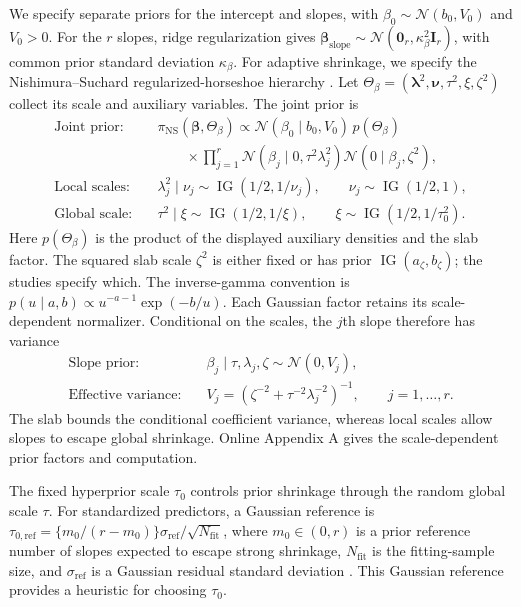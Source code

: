 \documentclass[12pt,letterpaper]{article}
\numberwithin{equation}{section}
\newcommand{\Normal}{\mathcal{N}}
\newcommand{\vect}[1]{\bm{#1}}
\newcommand{\mat}[1]{\bm{#1}}
\DeclareMathOperator{\IG}{IG}
\newcommand{\Id}[1]{\mat I_{#1}}
\newcommand{\zeros}[1]{\vect 0_{#1}}
\begin{document}
We specify separate priors for the intercept and slopes, with
\(\beta_0\sim\Normal(b_0,V_0)\) and \(V_0>0\). For the \(r\) slopes,
ridge regularization gives
\(\vect\beta_{\mathrm{slope}}\sim
\Normal(\zeros{r},\kappa_\beta^2\Id{r})\), with common prior standard
deviation \(\kappa_\beta\). For adaptive shrinkage, we specify the
Nishimura--Suchard regularized-horseshoe hierarchy
\citep{CarvalhoPolsonScott2010HS,PiironenVehtari2017RHS,
MakalicSchmidt2016SimpleSampler,NishimuraSuchard2023SSS}. Let
\(\Theta_\beta=(\vect\lambda^2,\vect\nu,\tau^2,\xi,\zeta^2)\)
collect its scale and auxiliary variables. The joint prior is
\begin{equation}
\begin{aligned}
\text{Joint prior:}\quad
&\pi_{\mathrm{NS}}(\vect\beta,\Theta_\beta)
 \propto\Normal(\beta_0\mid b_0,V_0)\,p(\Theta_\beta)\\
&\qquad\times\prod_{j=1}^r
 \Normal(\beta_j\mid0,\tau^2\lambda_j^2)
 \Normal(0\mid\beta_j,\zeta^2),\\
\text{Local scales:}\quad
&\lambda_j^2\mid\nu_j\sim\IG(1/2,1/\nu_j),\qquad
 \nu_j\sim\IG(1/2,1),\\
\text{Global scale:}\quad
&\tau^2\mid\xi\sim\IG(1/2,1/\xi),\qquad
 \xi\sim\IG(1/2,1/\tau_0^2).
\end{aligned}
\label{eq:rhs-product-main}
\end{equation}
Here \(p(\Theta_\beta)\) is the product of the displayed auxiliary
densities and the slab factor. The squared slab scale \(\zeta^2\) is
either fixed or has prior \(\IG(a_\zeta,b_\zeta)\); the studies specify
which. The inverse-gamma convention is
\(p(u\mid a,b)\propto u^{-a-1}\exp(-b/u)\).
Each Gaussian factor retains its scale-dependent normalizer. Conditional
on the scales, the \(j\)th slope therefore has variance
\begin{equation}
\begin{aligned}
\text{Slope prior:}\quad
&\beta_j\mid\tau,\lambda_j,\zeta\sim\Normal(0,V_j),\\
\text{Effective variance:}\quad
&V_j=\left(\zeta^{-2}+\tau^{-2}\lambda_j^{-2}\right)^{-1},
\qquad j=1,\ldots,r.
\end{aligned}
\label{eq:rhs-var}
\end{equation}
The slab bounds the conditional coefficient variance, whereas local scales
allow slopes to escape global shrinkage. Online Appendix A gives the
scale-dependent prior factors and computation.

The fixed hyperprior scale \(\tau_0\) controls prior shrinkage through the
random global scale \(\tau\). For standardized predictors, a Gaussian
reference is \(\tau_{0,\mathrm{ref}}=
\{m_0/(r-m_0)\}\sigma_{\mathrm{ref}}/\sqrt{N_{\mathrm{fit}}}\), where
\(m_0\in(0,r)\) is a prior reference number of slopes expected to escape
strong shrinkage, \(N_{\mathrm{fit}}\) is the fitting-sample size, and
\(\sigma_{\mathrm{ref}}\) is a Gaussian residual standard deviation
\citep{PiironenVehtari2017RHS}. This Gaussian reference provides a heuristic
for choosing \(\tau_0\).
\end{document}
